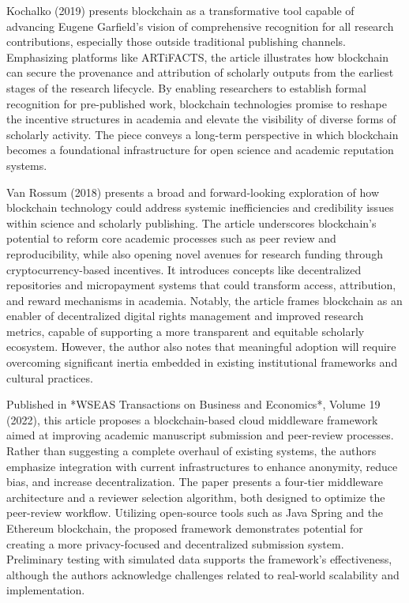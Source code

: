 \documentclass{article}
\begin{document}

Kochalko (2019) presents blockchain as a transformative tool capable of advancing Eugene Garfield’s vision of comprehensive recognition for all research contributions, especially those outside traditional publishing channels. Emphasizing platforms like ARTiFACTS, the article illustrates how blockchain can secure the provenance and attribution of scholarly outputs from the earliest stages of the research lifecycle. By enabling researchers to establish formal recognition for pre-published work, blockchain technologies promise to reshape the incentive structures in academia and elevate the visibility of diverse forms of scholarly activity. The piece conveys a long-term perspective in which blockchain becomes a foundational infrastructure for open science and academic reputation systems.


Van Rossum (2018) presents a broad and forward-looking exploration of how blockchain technology could address systemic inefficiencies and credibility issues within science and scholarly publishing. The article underscores blockchain’s potential to reform core academic processes such as peer review and reproducibility, while also opening novel avenues for research funding through cryptocurrency-based incentives. It introduces concepts like decentralized repositories and micropayment systems that could transform access, attribution, and reward mechanisms in academia. Notably, the article frames blockchain as an enabler of decentralized digital rights management and improved research metrics, capable of supporting a more transparent and equitable scholarly ecosystem. However, the author also notes that meaningful adoption will require overcoming significant inertia embedded in existing institutional frameworks and cultural practices.

Published in *WSEAS Transactions on Business and Economics*, Volume 19 (2022), this article proposes a blockchain-based cloud middleware framework aimed at improving academic manuscript submission and peer-review processes. Rather than suggesting a complete overhaul of existing systems, the authors emphasize integration with current infrastructures to enhance anonymity, reduce bias, and increase decentralization. The paper presents a four-tier middleware architecture and a reviewer selection algorithm, both designed to optimize the peer-review workflow. Utilizing open-source tools such as Java Spring and the Ethereum blockchain, the proposed framework demonstrates potential for creating a more privacy-focused and decentralized submission system. Preliminary testing with simulated data supports the framework’s effectiveness, although the authors acknowledge challenges related to real-world scalability and implementation.
\end{document}
